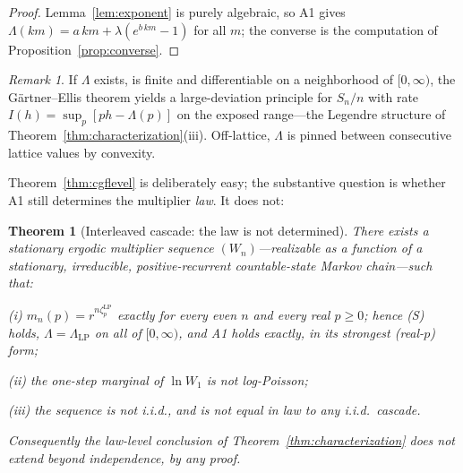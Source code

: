 \documentclass[12pt]{amsart}
\newtheorem{theorem}{Theorem}
\theoremstyle{definition}
\theoremstyle{remark}
\newtheorem*{remark}{Remark}
\begin{document}
\begin{proof}
Lemma~\ref{lem:exponent} is purely algebraic, so A1 gives
$\Lambda(km) = a\,km + \lambda(e^{b\,km}-1)$ for all $m$; the
converse is the computation of Proposition~\ref{prop:converse}.
\end{proof}

\begin{remark}
If $\Lambda$ exists, is finite and differentiable on a neighborhood
of $[0,\infty)$, the G\"artner--Ellis theorem \cite{DZ98} yields a
large-deviation principle for $S_n/n$ with rate $I(h) =
\sup_p[ph - \Lambda(p)]$ on the exposed range---the Legendre
structure of Theorem~\ref{thm:characterization}(iii).  Off-lattice,
$\Lambda$ is pinned between consecutive lattice values by convexity.
\end{remark}

Theorem~\ref{thm:cgflevel} is deliberately easy; the substantive
question is whether A1 still determines the multiplier \emph{law}.
It does not:

\begin{theorem}[Interleaved cascade: the law is not
determined]\label{thm:interleaved}
There exists a stationary ergodic multiplier sequence
$(W_n)$---realizable as a function of a stationary, irreducible,
positive-recurrent countable-state Markov chain---such that:

\textup{(i)} $m_n(p) = r^{n\zeta^{\mathrm{LP}}_p}$ \emph{exactly} for
every even $n$ and every real $p \ge 0$; hence \textup{(S)} holds,
$\Lambda = \Lambda_{\mathrm{LP}}$ on all of $[0,\infty)$, and A1
holds exactly, in its strongest (real-$p$) form;

\textup{(ii)} the one-step marginal of $\ln W_1$ is \emph{not}
log-Poisson;

\textup{(iii)} the sequence is not i.i.d., and is not equal in law
to any i.i.d.\ cascade.

Consequently the law-level conclusion of
Theorem~\ref{thm:characterization} does not extend beyond
independence, by any proof.
\end{theorem}
\end{document}
